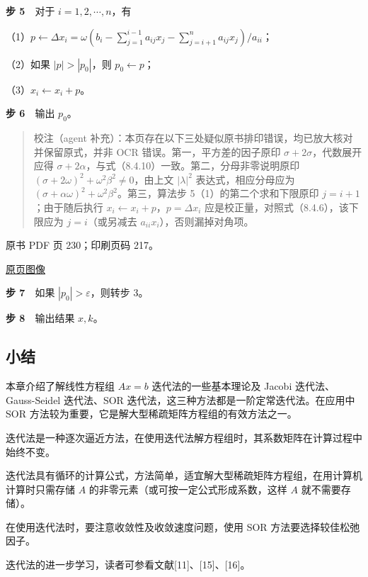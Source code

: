 \textbf{步 5}　对于 \(i=1,2,\cdots,n\)，有

（1）\(p\leftarrow\Delta x_i=\omega\left(b_i-\displaystyle\sum_{j=1}^{i-1}a_{ij}x_j-\displaystyle\sum_{j=i+1}^n a_{ij}x_j\right)/a_{ii}\)；

（2）如果 \(|p|>|p_0|\)，则 \(p_0\leftarrow p\)；

（3）\(x_i\leftarrow x_i+p\)。

\textbf{步 6}　输出 \(p_0\)。

\begin{quote}
校注（agent 补充）：本页存在以下三处疑似原书排印错误，均已放大核对并保留原式，并非 OCR 错误。第一，平方差的因子原印 \(\sigma+2\sigma\)，代数展开应得 \(\sigma+2\alpha\)，与式（8.4.10）一致。第二，分母非零说明原印 \((\sigma+2\omega)^2+\omega^2\beta^2\neq0\)，由上文 \(|\lambda|^2\) 表达式，相应分母应为 \((\sigma+\alpha\omega)^2+\omega^2\beta^2\)。第三，算法步 5（1）的第二个求和下限原印 \(j=i+1\)；由于随后执行 \(x_i\leftarrow x_i+p\)，\(p=\Delta x_i\) 应是校正量，对照式（8.4.6），该下限应为 \(j=i\)（或另减去 \(a_{ii}x_i\)），否则漏掉对角项。
\end{quote}

\clearpage

原书 PDF 页 230；印刷页码 217。

\href{source-images/pdf-230.jpeg}{原页图像}

\textbf{步 7}　如果 \(|p_0|>\varepsilon\)，则转步 3。

\textbf{步 8}　输出结果 \(x,k\)。

\subsection{小结}\label{ch08-ux5c0fux7ed3}

本章介绍了解线性方程组 \(Ax=b\) 迭代法的一些基本理论及 Jacobi 迭代法、Gauss-Seidel 迭代法、SOR 迭代法，这三种方法都是一阶定常迭代法。在应用中 SOR 方法较为重要，它是解大型稀疏矩阵方程组的有效方法之一。

迭代法是一种逐次逼近方法，在使用迭代法解方程组时，其系数矩阵在计算过程中始终不变。

迭代法具有循环的计算公式，方法简单，适宜解大型稀疏矩阵方程组，在用计算机计算时只需存储 \(A\) 的非零元素（或可按一定公式形成系数，这样 \(A\) 就不需要存储）。

在使用迭代法时，要注意收敛性及收敛速度问题，使用 SOR 方法要选择较佳松弛因子。

迭代法的进一步学习，读者可参看文献{[}11{]}、{[}15{]}、{[}16{]}。

